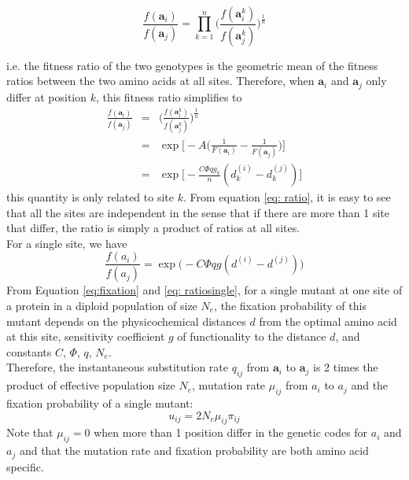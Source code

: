 \documentclass[13pt]{article}
\begin{document}
\begin{equation}
\frac{f(\mathbf{a}_i)}{f(\mathbf{a}_j)} = \prod_{k=1}^n\Big( \frac{f(\mathbf{a}_i^k)}{f(\mathbf{a}_j^k)}\Big)^{\frac{1}{n}}
\end{equation}


i.e. the fitness ratio of the two genotypes is the geometric mean of the fitness ratios between the two amino acids at all sites. Therefore, when $\mathbf{a}_i$ and $\mathbf{a}_j$ only differ at position $k$, this fitness ratio simplifies to  
\begin{eqnarray}
\frac{f(\mathbf{a}_i)}{f(\mathbf{a}_j)} & = & \Big( \frac{f(\mathbf{a}_i^k)}{f(\mathbf{a}_j^k)}\Big)^{\frac{1}{n}}\\
 & = &\exp \Big[-A\Big( \frac{1}{F(\mathbf{a}_i )} - \frac{1}{F(\mathbf{a}_j )}\Big)\Big] \nonumber\\
& = & \exp\Big[ -\frac{C\Phi q g_k}{n}(d_k^{(i)} - d_k^{(j)})\Big] \label{eq: ratio}
\end{eqnarray}
\noindent
this quantity is only related to site $k$. From equation \ref{eq: ratio}, it is easy to see that all the sites are independent in the sense that if there are more than 1 site that differ, the ratio is simply a product of ratios at all sites. \\

For a single site, we have 
\begin{equation}
\frac{f(a_i)}{f(a_j)} = \exp\Big(-C\Phi q g(d^{(i)}-d^{(j)})\Big)
\label{eq: ratiosingle}
\end{equation}
From Equation \ref{eq:fixation} and \ref{eq: ratiosingle}, for a single mutant at one site of a protein in a diploid population of size $N_e$, the fixation probability of this mutant depends on the physicochemical distances $d$ from the optimal amino acid at this site, sensitivity coefficient $g$ of functionality to the distance $d$, and constants $C$, $\Phi$, $q$, $N_e$.\\


Therefore, the instantaneous substitution rate $q_{ij}$ from $\mathbf{a}_i$ to $\mathbf{a}_j$ is 2 times the product of effective population size $N_e$, mutation rate $\mu_{ij}$ from $a_i$ to $a_j$ and the fixation probability of a single mutant:
\begin{equation}
u_{ij} = 2N_e \mu_{ij} \pi_{ij}
\label{eq:subrate}
\end{equation}
Note that $\mu_{ij} = 0$ when more than 1 position differ in the genetic codes for $a_i$ and $a_j$ and that the mutation rate and fixation probability are both amino acid specific. \\
\end{document}
